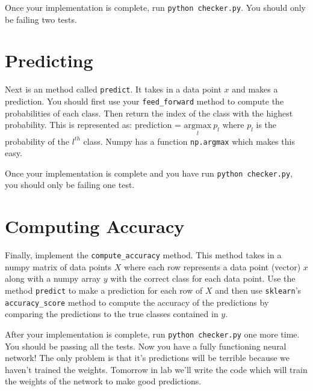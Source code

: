 \documentclass{article}
\begin{document}
Once your implementation is complete, run \texttt{python checker.py}. You should only be failing two tests.

\section{Predicting}

Next is an method called \texttt{predict}. It takes in a data point $x$ and makes a prediction. You should first use your \texttt{feed\_forward} method to compute the probabilities of each class. Then return the index of the class with the highest probability. This is represented as: prediction = $\underset{l}{\textrm{argmax}}\ p_l$ where $p_l$ is the probability of the $l^{th}$ class. Numpy has a function \texttt{np.argmax} which makes this easy.

Once your implementation is complete and you have run \texttt{python checker.py}, you should only be failing one test.

\section{Computing Accuracy}

Finally, implement the \texttt{compute\_accuracy} method. This method takes in a numpy matrix of data points $X$ where each row represents a data point (vector) $x$ along with a numpy array $y$ with the correct class for each data point. Use the method \texttt{predict} to make a prediction for each row of $X$ and then use \texttt{sklearn}'s \texttt{accuracy\_score} method to compute the accuracy of the predictions by comparing the predictions to the true classes contained in $y$.

After your implementation is complete, run \texttt{python checker.py} one more time. You should be passing all the tests. Now you have a fully functioning neural network! The only problem is that it's predictions will be terrible because we haven't trained the weights. Tomorrow in lab we'll write the code which will train the weights of the network to make good predictions.
\end{document}
